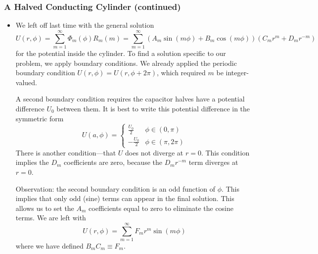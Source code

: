 \documentclass[11pt, a4paper]{article}
\begin{document}
\subsubsection{A Halved Conducting Cylinder (continued)}
\begin{itemize}	
		
	\item We left off last time with the general solution
	\begin{equation*}
		U(r, \phi) = \sum_{m = 1}^{\infty}\Phi_{m}(\phi)R_{m}(m) = \sum_{m = 1}^{\infty} \left(A_{m} \sin(m\phi) + B_{m}\cos(m\phi)\right)\left( C_{m}r^{m} + D_{m}r^{-m} \right)
	\end{equation*}
	for the potential inside the cylinder. To find a solution specific to our problem, we apply boundary conditions. We already applied the periodic boundary condition $ U(r, \phi) = U(r, \phi + 2\pi) $, which required $ m $ be integer-valued.
	
	
	A second boundary condition requires the capacitor halves have a potential difference $ U_{0} $ between them. It is best to write this potential difference in the symmetric form
	\begin{equation*}
		U(a, \phi) = 
		\begin{cases}
			\frac{U_{0}}{2} & \phi \in (0, \pi)\\
			-\frac{U_{0}}{2} & \phi \in (\pi, 2\pi)
		\end{cases}
	\end{equation*}
	There is another condition---that $ U $ does not diverge at $ r = 0 $. This condition implies the $ D_{m} $ coefficients are zero, because the $ D_{m}r^{-m} $ term diverges at $ r = 0 $. 
	
	Observation: the second boundary condition is an odd function of $ \phi $. This implies that only odd (sine) terms can appear in the final solution. This allows us to set the $ A_{m} $ coefficients equal to zero to eliminate the cosine terms. We are left with
	\begin{equation*}
		U(r, \phi) = \sum_{m=1}^{\infty} F_{m}r^{m} \sin (m\phi)
	\end{equation*}
	where we have defined $ B_{m}C_{m} \equiv F_{m} $. 
	

\end{itemize}
\end{document}

